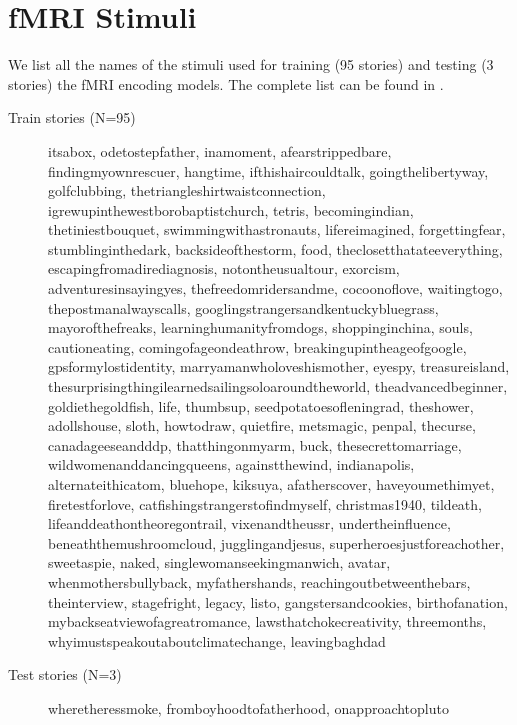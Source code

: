 \documentclass{article}
\theoremstyle{plain}
\theoremstyle{definition}
\theoremstyle{remark}
\begin{document}
\newpage 
\FloatBarrier
\section{fMRI Stimuli}
\label{app:stimuli}
\setcounter{figure}{0}    
\setcounter{table}{0} 
We list all the names of the stimuli used for training (95 stories) and testing (3 stories) the fMRI encoding models. The complete list can be found in \citep{LeBel_Wagner_Jain_Adhikari-Desai_Gupta_Morgenthal_Tang_Xu_Huth_2023}.

\begin{description}
    \item[Train stories (N=95)] itsabox, odetostepfather, inamoment, afearstrippedbare, findingmyownrescuer, hangtime, ifthishaircouldtalk, goingthelibertyway, golfclubbing, thetriangleshirtwaistconnection, igrewupinthewestborobaptistchurch, tetris, becomingindian, thetiniestbouquet, swimmingwithastronauts, lifereimagined, forgettingfear, stumblinginthedark, backsideofthestorm, food, theclosetthatateeverything, escapingfromadirediagnosis, notontheusualtour, exorcism, adventuresinsayingyes, thefreedomridersandme, cocoonoflove, waitingtogo, thepostmanalwayscalls, googlingstrangersandkentuckybluegrass, mayorofthefreaks, learninghumanityfromdogs, shoppinginchina, souls, cautioneating, comingofageondeathrow, breakingupintheageofgoogle, gpsformylostidentity, marryamanwholoveshismother, eyespy, treasureisland, thesurprisingthingilearnedsailingsoloaroundtheworld, theadvancedbeginner, goldiethegoldfish, life, thumbsup, seedpotatoesofleningrad, theshower, adollshouse, sloth, howtodraw, quietfire, metsmagic, penpal, thecurse, canadageeseandddp, thatthingonmyarm, buck, thesecrettomarriage, wildwomenanddancingqueens, againstthewind, indianapolis, alternateithicatom, bluehope, kiksuya, afatherscover, haveyoumethimyet, firetestforlove, catfishingstrangerstofindmyself, christmas1940, tildeath, lifeanddeathontheoregontrail, vixenandtheussr, undertheinfluence, beneaththemushroomcloud, jugglingandjesus, superheroesjustforeachother, sweetaspie, naked, singlewomanseekingmanwich, avatar, whenmothersbullyback, myfathershands, reachingoutbetweenthebars, theinterview, stagefright, legacy, listo, gangstersandcookies, birthofanation, mybackseatviewofagreatromance, lawsthatchokecreativity, threemonths, whyimustspeakoutaboutclimatechange, leavingbaghdad
    \item[Test stories (N=3)] wheretheressmoke, fromboyhoodtofatherhood, onapproachtopluto
\end{description}
\end{document}
